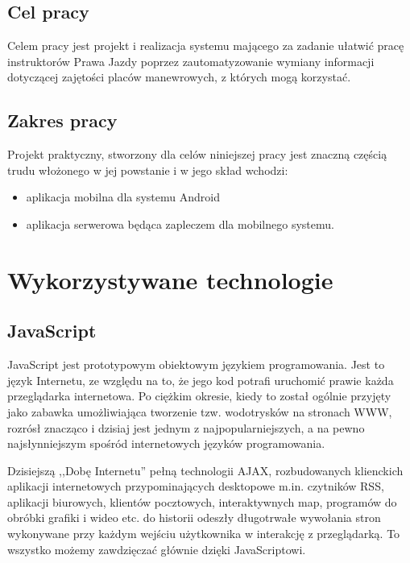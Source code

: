 \documentclass[twoside,a4paper,openright,12pt]{book}
\begin{document}
\section{Cel pracy}

Celem pracy jest projekt i realizacja systemu mającego za zadanie ułatwić pracę instruktorów Prawa Jazdy poprzez zautomatyzowanie wymiany informacji dotyczącej zajętości placów manewrowych, z których mogą korzystać.


\section{Zakres pracy}

Projekt praktyczny, stworzony dla celów niniejszej pracy jest znaczną częścią trudu włożonego w jej powstanie i w jego skład wchodzi:

\begin{itemize}
	\item aplikacja mobilna dla systemu Android
	\item aplikacja serwerowa będąca zapleczem dla mobilnego systemu.
\end{itemize}




\chapter{Wykorzystywane technologie}

\section{JavaScript}

JavaScript jest prototypowym obiektowym językiem programowania. Jest to język Internetu, ze względu na to, że jego kod potrafi uruchomić prawie każda przeglądarka internetowa. Po ciężkim okresie, kiedy to został ogólnie przyjęty jako zabawka umożliwiająca tworzenie tzw. wodotrysków na stronach WWW, rozrósł znacząco i dzisiaj jest jednym z najpopularniejszych, a na pewno najsłynniejszym spośród internetowych języków programowania.

Dzisiejszą ,,Dobę Internetu'' pełną technologii AJAX, rozbudowanych klienckich aplikacji internetowych przypominających desktopowe m.in. czytników RSS, aplikacji biurowych, klientów pocztowych, interaktywnych map, programów do obróbki grafiki i wideo etc. do historii odeszły długotrwałe wywołania stron wykonywane przy każdym wejściu użytkownika  w interakcję z przeglądarką. To wszystko możemy zawdzięczać głównie dzięki JavaScriptowi.
\end{document}
